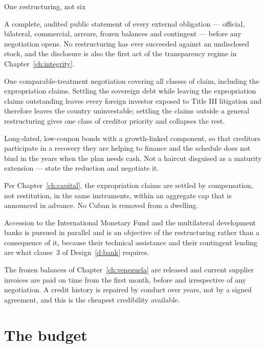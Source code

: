 \begin{design}{One restructuring, not six}
\label{d:debt}
\begin{rules}
 A complete, audited public statement of every external
obligation --- official, bilateral, commercial, arrears, frozen balances and
contingent --- before any negotiation opens. No restructuring has ever succeeded
against an undisclosed stock, and the disclosure is also the first act of the
transparency regime in Chapter~\ref{ch:integrity}.

 One comparable-treatment negotiation covering all classes
of claim, including the expropriation claims. Settling the sovereign debt while
leaving the expropriation claims outstanding leaves every foreign investor
exposed to Title III litigation and therefore leaves the country uninvestable;
settling the claims outside a general restructuring gives one class of creditor
priority and collapses the rest.

 Long-dated, low-coupon bonds with a growth-linked component,
so that creditors participate in a recovery they are helping to finance and the
schedule does not bind in the years when the plan needs cash. Not a haircut
disguised as a maturity extension --- state the reduction and negotiate it.

 Per Chapter~\ref{ch:capital}, the
expropriation claims are settled by compensation, not restitution, in the same
instruments, within an aggregate cap that is announced in advance. No Cuban is
removed from a dwelling.

 Accession to the International Monetary Fund and
the multilateral development banks is pursued in parallel and is an objective of
the restructuring rather than a consequence of it, because their technical
assistance and their contingent lending are what clause~3 of
Design~\ref{d:bank} requires.

 The frozen balances of Chapter~\ref{ch:venezuela}
are released and current supplier invoices are paid on time from the first
month, before and irrespective of any negotiation. A credit history is repaired
by conduct over years, not by a signed agreement, and this is the cheapest
credibility available.
\end{rules}
\end{design}

\section{The budget}

